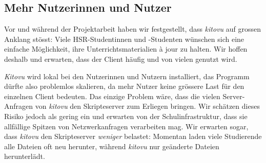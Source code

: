 \documentclass[a4paper]{article}
\begin{document}
\subsection{Mehr Nutzerinnen und Nutzer}

Vor und während der Projektarbeit haben wir festgestellt, dass \emph{kitovu} auf grossen Anklang stösst: Viele HSR-Studentinnen und -Studenten wünschen sich eine einfache Möglichkeit, ihre Unterrichtsmaterialien à jour zu halten. Wir hoffen deshalb und erwarten, dass der Client häufig und von vielen genutzt wird.

\emph{Kitovu} wird lokal bei den Nutzerinnen und Nutzern installiert, das Programm dürfte also problemlos skalieren, da mehr Nutzer keine grössere Last für den einzelnen Client bedeuten. Das einzige Problem wäre, dass die vielen Server-Anfragen von \emph{kitovu} den Skripteserver zum Erliegen bringen. Wir schätzen dieses Risiko jedoch als gering ein und erwarten von der Schulinfrastruktur, dass sie allfällige Spitzen von Netzwerkanfragen verarbeiten mag. Wir erwarten sogar, dass  \emph{kitovu} den Skripteserver \emph{weniger} belastet: Momentan laden viele Studierende alle Dateien oft neu herunter, während \emph{kitovu} nur geänderte Dateien herunterlädt.
\end{document}
